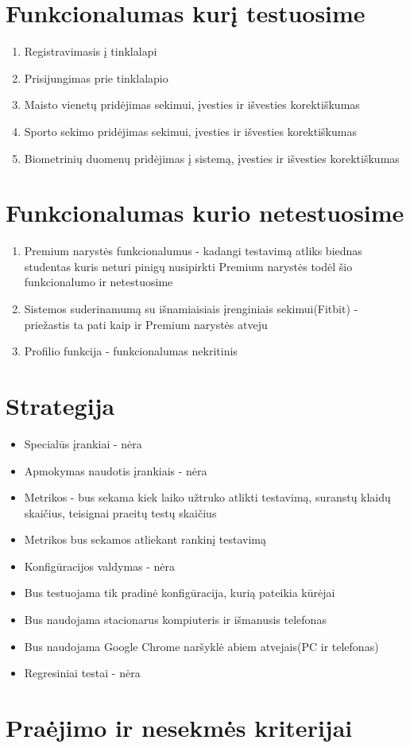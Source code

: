 \documentclass[oneside]{VUMIFPSkursinis}
\begin{document}
\section{Funkcionalumas kurį testuosime}
	\begin{enumerate}
		\item{Registravimasis į tinklalapi}
		\item{Prisijungimas prie tinklalapio}
		\item{Maisto vienetų pridėjimas sekimui, įvesties ir išvesties korektiškumas}
		\item{Sporto sekimo pridėjimas sekimui, įvesties ir išvesties korektiškumas}
		\item{Biometrinių duomenų pridėjimas į sistemą, įvesties ir išvesties korektiškumas}
	\end{enumerate}
\section{Funkcionalumas kurio netestuosime}
	\begin{enumerate}
		\item{Premium narystės funkcionalumus - kadangi testavimą atliks biednas studentas kuris neturi pinigų nusipirkti Premium narystės todėl šio funkcionalumo ir netestuosime}
		\item{Sistemos suderinamumą su išnamiaisiais įrenginiais sekimui(Fitbit) - priežastis ta pati kaip ir Premium narystės atveju}
		\item{Profilio funkcija - funkcionalumas nekritinis}
	\end{enumerate}	
\section{Strategija}
	\begin{itemize}
		\item{Specialūs įrankiai - nėra}
		\item{Apmokymas naudotis įrankiais - nėra}
		\item{Metrikos - bus sekama kiek laiko užtruko atlikti testavimą, suranstų klaidų skaičius, teisignai praeitų testų skaičius}
		\item{Metrikos bus sekamos atliekant rankinį testavimą}
		\item{Konfigūracijos valdymas - nėra}
		\item{Bus testuojama tik pradinė konfigūracija, kurią pateikia kūrėjai}
		\item{Bus naudojama stacionarus kompiuteris ir išmanusis telefonas}
		\item{Bus naudojama Google Chrome naršyklė abiem atvejais(PC ir telefonas)}
		\item{Regresiniai testai - nėra}
	\end{itemize}

\section{Praėjimo ir nesekmės kriterijai}
\end{document}
